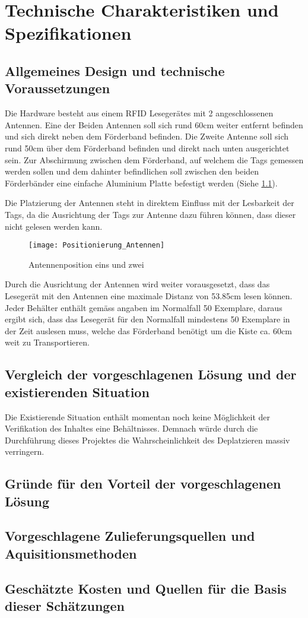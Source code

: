 \chapter{Technische Charakteristiken und Spezifikationen}

\section{Allgemeines Design und technische Voraussetzungen}
Die Hardware besteht aus einem RFID Lesegerätes mit 2 angeschlossenen Antennen. Eine der Beiden Antennen soll sich rund 60cm weiter entfernt befinden und sich direkt neben dem Förderband befinden. Die Zweite Antenne soll sich rund 50cm über dem Förderband befinden und direkt nach unten ausgerichtet sein. Zur Abschirmung zwischen dem Förderband, auf welchem die Tags gemessen werden sollen und dem dahinter befindlichen soll zwischen den beiden Förderbänder eine einfache Aluminium Platte befestigt werden (Siehe \ref{fig:positionAntennen}).

Die Platzierung der Antennen steht in direktem Einfluss mit der Lesbarkeit der Tags, da die Ausrichtung der Tags zur Antenne dazu führen können, dass dieser nicht gelesen werden kann.

\begin{figure}
	\centering
	\texttt{[image: Positionierung\_Antennen]}
	\caption{Antennenposition eins und zwei}
	\label{fig:positionAntennen}
\end{figure}


Durch die Ausrichtung der Antennen wird weiter vorausgesetzt, dass das Lesegerät mit den Antennen eine maximale Distanz von 53.85cm lesen können. Jeder Behälter enthält gemäss angaben im Normalfall 50 Exemplare, daraus ergibt sich, dass das Lesegerät für den Normalfall mindestens 50 Exemplare in der Zeit auslesen muss, welche das Förderband benötigt um die Kiste ca. 60cm weit zu Transportieren.

\section{Vergleich der vorgeschlagenen Lösung und der existierenden Situation}
Die Existierende Situation enthält momentan noch keine Möglichkeit der Verifikation des Inhaltes eine Behältnisses. Demnach würde durch die Durchführung dieses Projektes die Wahrscheinlichkeit des Deplatzieren massiv verringern.

\section{Gründe für den Vorteil der vorgeschlagenen Lösung}


\section{Vorgeschlagene Zulieferungsquellen und Aquisitionsmethoden}

\section{Geschätzte Kosten und Quellen für die Basis dieser Schätzungen}
